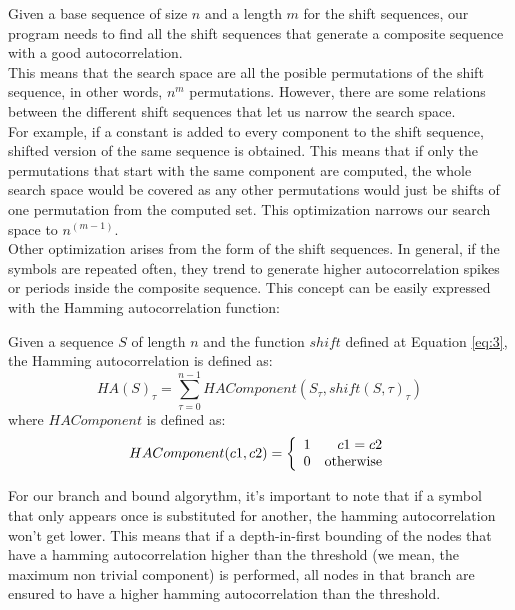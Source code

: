   Given a base sequence of size $n$ and a length $m$ for the shift sequences,
  our program needs to find all the shift sequences that generate a composite
  sequence with a good autocorrelation.\\

  This means that the search space are all the posible permutations of the
  shift sequence, in other words, $n^m$ permutations. However, there are some
  relations between the different shift sequences that let us narrow the
  search space.\\

  For example, if a constant is added to every component to the shift sequence,
  shifted version of the same sequence is obtained. This means that if only
  the permutations that start with the same component are computed,
  the whole search space would be covered as any other permutations would just
  be shifts of one permutation from the computed set. This optimization narrows
  our search space to $n^{(m-1)}$.\\

  Other optimization arises from the form of the shift sequences. In general,
  if the symbols are repeated often, they trend to generate higher
  autocorrelation spikes or periods inside the composite sequence. This
  concept can be easily expressed with the Hamming autocorrelation function:\\

  \begin{definition}
    Given a sequence $S$ of length $n$ and the function $shift$ defined at
    Equation \eqref{eq:3}, the Hamming autocorrelation is defined as:
      \begin{equation} \label{hamming:eq:1}
        HA(S)_{\tau} = \sum_{\tau = 0}^{n-1} HAComponent(S_{\tau}, shift(S, \tau)_{\tau})
      \end{equation}
    where $HAComponent$ is defined as:
      \begin{equation}
        HAComponent(c1, c2) = \left\{\begin{array}{lr}
            1  &  c1 = c2\\
            0  & \textnormal{otherwise} \\
        \end{array}\right.
      \end{equation}
  \end{definition}

  For our branch and bound algorythm, it's important to note that if a symbol
  that only appears once is substituted for another, the hamming
  autocorrelation won't get lower. This means that if a depth-in-first
  bounding of the nodes that have a hamming autocorrelation higher than the
  threshold (we mean, the maximum non trivial component) is performed,
  all nodes in that branch are ensured to have a higher hamming autocorrelation
  than the threshold.\\

